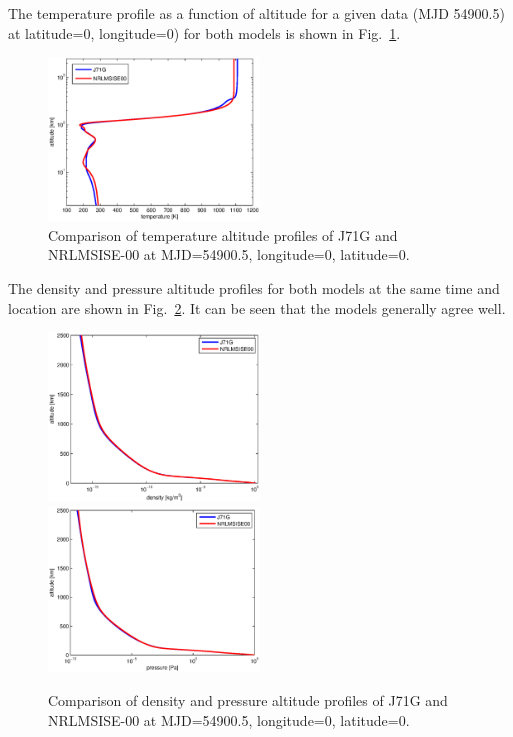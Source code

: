 \documentclass[Orbiter Technical Reference.tex]{subfiles}
\begin{document}
The temperature profile as a function of altitude for a given data (MJD 54900.5) at latitude=0, longitude=0) for both models is shown in Fig.~\ref{fig:comp_t}.
\begin{figure}
\includegraphics[width=0.5\textwidth]{j71g_nrlmsise00_cmp1.eps}
\caption{Comparison of temperature altitude profiles of J71G and NRLMSISE-00 at MJD=54900.5, longitude=0, latitude=0.}
\label{fig:comp_t}
\end{figure}
The density and pressure altitude profiles for both models at the same time and location are shown in Fig.~\ref{fig:comp_dns_p}. It can be seen that the models generally agree well.
\begin{figure}
\includegraphics[width=0.5\textwidth]{j71g_nrlmsise00_cmp2.eps}
\includegraphics[width=0.5\textwidth]{j71g_nrlmsise00_cmp3.eps}
\caption{Comparison of density and pressure altitude profiles of J71G and NRLMSISE-00 at MJD=54900.5, longitude=0, latitude=0.}
\label{fig:comp_dns_p}
\end{figure}
\end{document}
